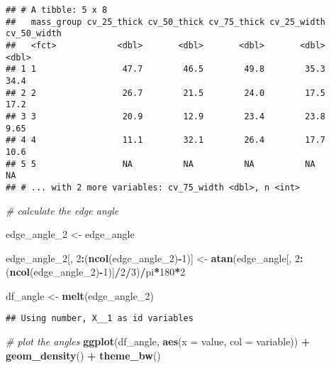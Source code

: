 \documentclass[]{article}
\newenvironment{Shaded}{\begin{snugshade}}{\end{snugshade}}
\newcommand{\KeywordTok}[1]{\textcolor[rgb]{0.13,0.29,0.53}{\textbf{#1}}}
\newcommand{\DataTypeTok}[1]{\textcolor[rgb]{0.13,0.29,0.53}{#1}}
\newcommand{\DecValTok}[1]{\textcolor[rgb]{0.00,0.00,0.81}{#1}}
\newcommand{\StringTok}[1]{\textcolor[rgb]{0.31,0.60,0.02}{#1}}
\newcommand{\CommentTok}[1]{\textcolor[rgb]{0.56,0.35,0.01}{\textit{#1}}}
\newcommand{\OperatorTok}[1]{\textcolor[rgb]{0.81,0.36,0.00}{\textbf{#1}}}
\newcommand{\NormalTok}[1]{#1}
\begin{document}
\begin{verbatim}
## # A tibble: 5 x 8
##   mass_group cv_25_thick cv_50_thick cv_75_thick cv_25_width cv_50_width
##   <fct>            <dbl>       <dbl>       <dbl>       <dbl>       <dbl>
## 1 1                 47.7        46.5        49.8        35.3       34.4 
## 2 2                 26.7        21.5        24.0        17.5       17.2 
## 3 3                 20.9        12.9        23.4        23.8        9.65
## 4 4                 11.1        32.1        26.4        17.7       10.6 
## 5 5                 NA          NA          NA          NA         NA   
## # ... with 2 more variables: cv_75_width <dbl>, n <int>
\end{verbatim}

\begin{Shaded}
\begin{Highlighting}[]
\CommentTok{# calculate the edge angle}

\NormalTok{edge_angle_}\DecValTok{2}\NormalTok{ <-}\StringTok{ }\NormalTok{edge_angle}

\NormalTok{edge_angle_}\DecValTok{2}\NormalTok{[, }\DecValTok{2}\OperatorTok{:}\NormalTok{(}\KeywordTok{ncol}\NormalTok{(edge_angle_}\DecValTok{2}\NormalTok{)}\OperatorTok{-}\DecValTok{1}\NormalTok{)] <-}\StringTok{ }\KeywordTok{atan}\NormalTok{(edge_angle[, }\DecValTok{2}\OperatorTok{:}\NormalTok{(}\KeywordTok{ncol}\NormalTok{(edge_angle_}\DecValTok{2}\NormalTok{)}\OperatorTok{-}\DecValTok{1}\NormalTok{)]}\OperatorTok{/}\DecValTok{2}\OperatorTok{/}\DecValTok{3}\NormalTok{)}\OperatorTok{/}\NormalTok{pi}\OperatorTok{*}\DecValTok{180}\OperatorTok{*}\DecValTok{2}



\NormalTok{df_angle <-}\StringTok{ }\KeywordTok{melt}\NormalTok{(edge_angle_}\DecValTok{2}\NormalTok{)}
\end{Highlighting}
\end{Shaded}

\begin{verbatim}
## Using number, X__1 as id variables
\end{verbatim}

\begin{Shaded}
\begin{Highlighting}[]
\CommentTok{# plot the angles }
\KeywordTok{ggplot}\NormalTok{(df_angle, }\KeywordTok{aes}\NormalTok{(}\DataTypeTok{x =}\NormalTok{ value, }\DataTypeTok{col =}\NormalTok{ variable)) }\OperatorTok{+}\StringTok{ }\KeywordTok{geom_density}\NormalTok{() }\OperatorTok{+}\StringTok{ }\KeywordTok{theme_bw}\NormalTok{()}
\end{Highlighting}
\end{Shaded}
\end{document}
